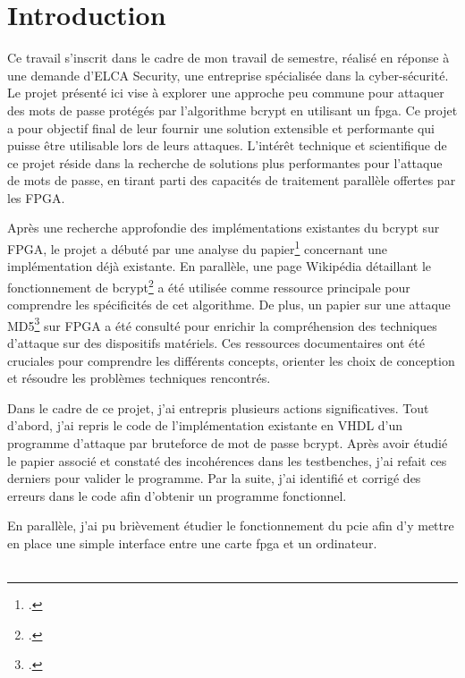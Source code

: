 \chapter*{Introduction}


Ce travail s'inscrit dans le cadre de mon travail de semestre, réalisé en réponse à une demande d'ELCA Security, une entreprise spécialisée dans la cyber-sécurité. Le projet présenté ici vise à explorer une approche peu commune pour attaquer des mots de passe protégés par l'algorithme bcrypt en utilisant un \gls{fpga}. Ce projet a pour objectif final de leur fournir une solution extensible et performante qui puisse être utilisable lors de leurs attaques. L'intérêt technique et scientifique de ce projet réside dans la recherche de solutions plus performantes pour l'attaque de mots de passe, en tirant parti des capacités de traitement parallèle offertes par les FPGA.


Après une recherche approfondie des implémentations existantes du bcrypt sur FPGA, le projet a débuté par une analyse du papier\footcite{wiemer_high-speed_2014} concernant une implémentation déjà existante. En parallèle, une page Wikipédia détaillant le fonctionnement de bcrypt\footcite{noauthor_bcrypt_2024} a été utilisée comme ressource principale pour comprendre les spécificités de cet algorithme. De plus, un papier sur une attaque MD5\footcite{gillela_parallelization_2019} sur FPGA a été consulté pour enrichir la compréhension des techniques d'attaque sur des dispositifs matériels. Ces ressources documentaires ont été cruciales pour comprendre les différents concepts, orienter les choix de conception et résoudre les problèmes techniques rencontrés.

Dans le cadre de ce projet, j'ai entrepris plusieurs actions significatives. Tout d'abord, j'ai repris le code de l'implémentation existante en VHDL d'un programme d'attaque par bruteforce de mot de passe bcrypt. Après avoir étudié le papier associé et constaté des incohérences dans les testbenches, j'ai refait ces derniers pour valider le programme. Par la suite, j'ai identifié et corrigé des erreurs dans le code afin d'obtenir un programme fonctionnel.

En parallèle, j'ai pu brièvement étudier le fonctionnement du \gls{pcie} afin d'y mettre en place une simple interface entre une carte \gls{fpga} et un ordinateur.\\\

